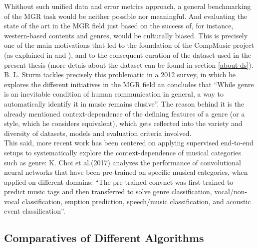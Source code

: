 Whithout such unified data and error metrics approach, a general benchmarking of the MGR task would be neither possible nor meaningful. And evaluating the state of the art in the MGR field just based on the success of, for instance, western-based contents and genres, would be culturally biased. This is precisely one of the main motivations that led to the foundation of the CompMusic project (as explained in \cite{serra-comp11} and \cite{serra-comp14}), and to the consequent curation of the dataset used in the present thesis (more detais about the dataset can be found in section \ref{about-ds}).\\

B. L. Sturm tackles precisely this problematic in a 2012 survey\cite{mgr_survey}, in which he explores the different initiatives in the MGR field an concludes that ``While genre is an inevitable condition of human communication in general, a way to automatically identify it in music remains elusive''. The reason behind it is the already mentioned context-dependence of the defining features of a genre (or a style, which he considers equivalent), which gets reflected into the variety and diversity of datasets, models and evaluation criteria involved.\\

This said, more recent work has been centered on applying supervised end-to-end setups to systematically explore the context-dependence of musical categories such as genre: K. Choi et al.(2017)\cite{convtransfer} analyzes the performance of convolutional neural networks that have been pre-trained on specific musical categories, when applied on different domains: ``The pre-trained convnet was first trained to predict music tags and then transferred to solve genre classification, vocal/non-vocal classification, emption prediction, speech/music classification, and acoustic event classification''\cite{convtransfer}.\\

\subsection{Comparatives of Different Algorithms}

